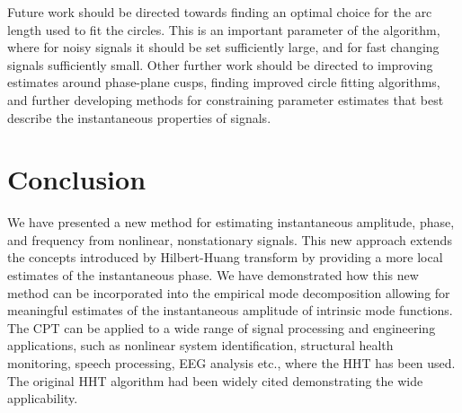 \documentclass[a4paper]{IEEEtran}
\begin{document}
Future work should be directed towards finding an optimal choice for the arc length used to fit the circles. This is an important parameter of the algorithm, where for noisy signals it should be set sufficiently large, and for fast changing signals sufficiently small. Other further work should be directed to improving estimates around phase-plane cusps, finding improved circle fitting algorithms, and further developing methods for constraining parameter estimates that best describe the instantaneous properties of signals.


\section{Conclusion}\label{sect:ConclusionSection}
We have presented a new method for estimating instantaneous amplitude, phase, and frequency from nonlinear, nonstationary signals. This new approach extends the concepts introduced by Hilbert-Huang transform by providing a more local estimates of the instantaneous phase. We have demonstrated how this new method can be incorporated into the empirical mode decomposition allowing for meaningful estimates of the instantaneous amplitude of intrinsic mode functions. The CPT can be applied to a wide range of signal processing and engineering applications, such as nonlinear system identification, structural health monitoring, speech processing, EEG analysis etc., where the HHT has been used. The original HHT algorithm had been widely cited demonstrating the wide applicability. 
\end{document}
